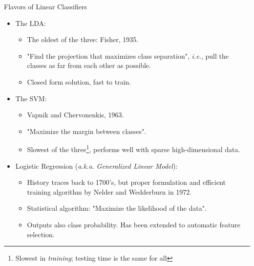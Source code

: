 \documentclass[10pt, aspectratio=169]{beamer} %
\begin{document}
\begin{frame}{Flavors of Linear Classifiers}
\begin{itemize}
\item The LDA:
\begin{itemize}
\item The oldest of the three: Fisher, 1935.
\item "Find the projection that maximizes class separation", \emph{i.e.}, pull the 
classes as far from each other as possible.
\item Closed form solution, fast to train.
\end{itemize}

\item The SVM:
\begin{itemize}
\item Vapnik and Chervonenkis, 1963.
\item "Maximize the margin between classes". 
\item Slowest of the three\footnote{Slowest in \emph{training}; testing time is the same for all}, performs well with sparse high-dimensional data.
\end{itemize}

\item Logistic Regression (\emph{a.k.a.} \emph{Generalized Linear Model}):
\begin{itemize}
\item History traces back to 1700's, but proper formulation and efficient training algorithm 
by Nelder and Wedderburn in 1972.
\item Statistical algorithm: "Maximize the likelihood of the data". 
\item Outputs also class probability. Has been extended to automatic feature selection.
\end{itemize}

\end{itemize}
\end{frame}
\end{document}
